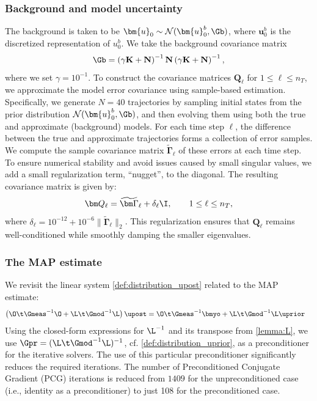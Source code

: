 \documentclass{aims} %
\theoremstyle{definition}
\begin{document}
\subsubsection*{Background and model uncertainty} The background is taken to be
$\bm{u}_0  \sim \mathcal{N}( \bm{u}_0^{b}, \Gb)$, where $\bm{u}_0^{b}$ is the discretized representation of $u_0^b$.
  We take the background covariance matrix  
\begin{align}
\Gb = \left(\gamma\mathbf{K} + \mathbf{N}\right)^{-1}\mathbf{N} \left(\gamma\mathbf{K} +\mathbf{N}\right)^{-1},
\end{align}
where we set  $\gamma=10^{-1}$. To construct the covariance matrices \(\bm Q_\ell\) for \(1 \leq \ell \leq n_T\), we approximate the model error covariance using sample-based estimation. Specifically, we generate \(N = 40\) trajectories by sampling initial states from the  prior distribution $\mathcal{N}( \bm{u}_0^{b}, \Gb)$,  and then evolving them using both the true and approximate (background) models. For each time step \(\ell\), the difference between the true and approximate trajectories forms a collection of error samples. We compute the sample covariance matrix \(\widetilde{\bm \Gamma}_\ell\) of these errors at each time step. 
To ensure numerical stability and avoid issues caused by small singular values, we add a small regularization term,  ``nugget'', to the diagonal. The resulting covariance matrix is given by:
\[
\bm Q_\ell = \widetilde{\bm \Gamma}_\ell + \delta_\ell \I, \qquad 1 \leq \ell \leq n_T,
\]
where \(\delta_\ell = 10^{-12} + 10^{-6} \|\widetilde{\bm \Gamma}_\ell\|_2\). This regularization ensures that \(\bm Q_\ell\) remains well-conditioned while smoothly damping the smaller eigenvalues.
%
\subsubsection*{The MAP estimate}
We revisit the linear system  \eqref{def:distribution_upost} related to the MAP estimate:
\begin{align*}
    \left( \O\t \Gmeas^{-1} \O + \L\t \Gmod^{-1} \L\right) \upost
&= 
    \O\t \Gmeas^{-1} \bmyo + \L\t \Gmod^{-1} \L \uprior
\end{align*}
Using the closed-form expressions for $\L^{-1}$ and its transpose from \eqref{lemma:L}, we use  $\Gpr = (\L\t \Gmod^{-1} \L)^{-1}$, cf. \eqref{def:distribution_uprior},  as a preconditioner for the iterative solvers.
%
The use of this particular preconditioner significantly reduces the required iterations. The number of Preconditioned Conjugate Gradient (PCG) iterations is reduced from $1409$ for the unpreconditioned case (i.e., identity as a preconditioner) to just 108 for the preconditioned case.   
\end{document}
